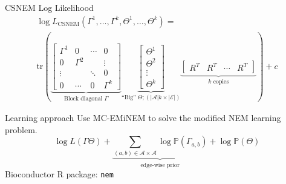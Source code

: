 \documentclass[aspectratio=169]{beamer}
\begin{document}
\begin{frame}{CSNEM Log Likelihood}
\begin{multline*}
\log L_\text{CSNEM}( \Gamma^1, \ldots, \Gamma^k, \Theta^1, \ldots, \Theta^k )
 = \\ \mathrm{tr}\left(
 \underbrace{\begin{bmatrix}
	\Gamma^1 & 0 & \cdots & 0 \\
	0 & \Gamma^2 & & \vdots \\
	\vdots & & \ddots & 0 \\
	0 & \cdots & 0 & \Gamma^k
 \end{bmatrix}}_{\text{Block diagonal } \Gamma}
 \underbrace{\begin{bmatrix}
	\Theta^1 \\
	\Theta^2 \\
	\vdots \\
	\Theta^k
 \end{bmatrix}}_{\text{``Big'' } \Theta; (|\mathcal A|k \times |\mathcal E|)}
 \underbrace{\begin{bmatrix}
	R^T & R^T & \cdots & R^T
 \end{bmatrix}}_{k \text{ copies}} \right) + c
\end{multline*}
\end{frame}

\begin{frame}{Learning approach}
Use MC-EMiNEM \parencite{niederberger2012mc} to solve the modified NEM learning problem.
\[
\log L( \Gamma \Theta ) + \underbrace{\sum_{(a,b) \in \mathcal A \times \mathcal A} \log \mathbb P(\Gamma_{a,b})}_{\text{edge-wise prior}} + \log \mathbb P( \Theta )
\]
\vfill
Bioconductor R package: \texttt{nem} \parencite{frohlich2008analyzing}
\end{frame}


\end{document}
